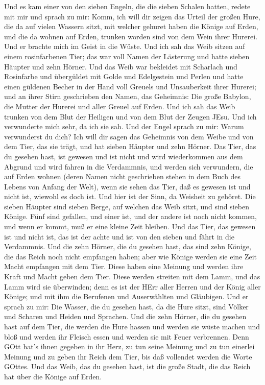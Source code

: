  Und es kam einer von den sieben Engeln, die die sieben
Schalen hatten, redete mit mir und sprach zu mir: Komm, ich will dir
zeigen das Urteil der großen Hure, die da auf vielen Wassern sitzt,
 mit welcher gehuret haben die Könige auf Erden, und die da
wohnen auf Erden, trunken worden sind von dem Wein ihrer Hurerei.
 Und er brachte mich im Geist in die Wüste. Und ich sah das
Weib sitzen auf einem rosinfarbenen Tier; das war voll Namen der
Lästerung und hatte sieben Häupter und zehn Hörner.  Und das
Weib war bekleidet mit Scharlach und Rosinfarbe und übergüldet mit Golde
und Edelgestein und Perlen und hatte einen güldenen Becher in der Hand
voll Greuels und Unsauberkeit ihrer Hurerei;  und an ihrer
Stirn geschrieben den Namen, das Geheimnis: Die große Babylon, die
Mutter der Hurerei und aller Greuel auf Erden.  Und ich sah
das Weib trunken von dem Blut der Heiligen und von dem Blut der Zeugen
JEsu. Und ich verwunderte mich sehr, da ich sie sah.  Und
der Engel sprach zu mir: Warum verwunderst du dich? Ich will dir sagen
das Geheimnis von dem Weibe und von dem Tier, das sie trägt, und hat
sieben Häupter und zehn Hörner.  Das Tier, das du gesehen
hast, ist gewesen und ist nicht und wird wiederkommen aus dem Abgrund
und wird fahren in die Verdammnis, und werden sich verwundern, die auf
Erden wohnen (deren Namen nicht geschrieben stehen in dem Buch des
Lebens von Anfang der Welt), wenn sie sehen das Tier, daß es gewesen ist
und nicht ist, wiewohl es doch ist.  Und hier ist der Sinn,
da Weisheit zu gehöret. Die sieben Häupter sind sieben Berge, auf
welchen das Weib sitzt, und sind sieben Könige.  Fünf sind
gefallen, und einer ist, und der andere ist noch nicht kommen, und wenn
er kommt, muß er eine kleine Zeit bleiben.  Und das Tier,
das gewesen ist und nicht ist, das ist der achte und ist von den sieben
und fährt in die Verdammnis.  Und die zehn Hörner, die du
gesehen hast, das sind zehn Könige, die das Reich noch nicht empfangen
haben; aber wie Könige werden sie eine Zeit Macht empfangen mit dem
Tier.  Diese haben eine Meinung und werden ihre Kraft und
Macht geben dem Tier.  Diese werden streiten mit dem Lamm,
und das Lamm wird sie überwinden; denn es ist der HErr aller Herren und
der König aller Könige; und mit ihm die Berufenen und Auserwählten und
Gläubigen.  Und er sprach zu mir: Die Wasser, die du
gesehen hast, da die Hure sitzt, sind Völker und Scharen und Heiden und
Sprachen.  Und die zehn Hörner, die du gesehen hast auf dem
Tier, die werden die Hure hassen und werden sie wüste machen und bloß
und werden ihr Fleisch essen und werden sie mit Feuer verbrennen.
 Denn GOtt hat's ihnen gegeben in ihr Herz, zu tun seine
Meinung und zu tun einerlei Meinung und zu geben ihr Reich dem Tier, bis
daß vollendet werden die Worte GOttes.  Und das Weib, das
du gesehen hast, ist die große Stadt, die das Reich hat über die Könige
auf Erden.

